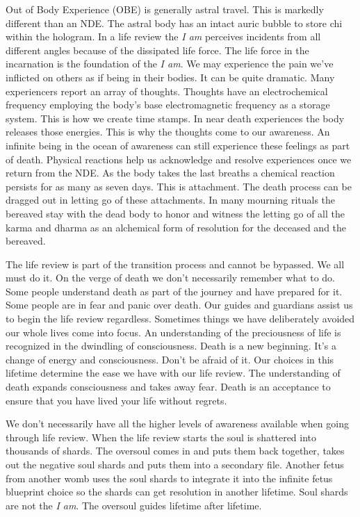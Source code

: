 \documentclass[letterpaper,9pt,twoside,titlepage,onecolumn,openany]{book}
\begin{document}
Out of Body Experience (OBE) is generally astral travel. This is
markedly different than an NDE. The astral body has an intact auric
bubble to store chi within the hologram. In a life review the \emph{I
am} perceives incidents from all different angles because of the
dissipated life force. The life force in the incarnation is the
foundation of the \emph{I am}. We may experience the pain we've
inflicted on others as if being in their bodies. It can be quite
dramatic. Many experiencers report an array of thoughts. Thoughts have
an electrochemical frequency employing the body's base electromagnetic
frequency as a storage system. This is how we create time stamps. In
near death experiences the body releases those energies. This is why the
thoughts come to our awareness. An infinite being in the ocean of
awareness can still experience these feelings as part of death. Physical
reactions help us acknowledge and resolve experiences once we return
from the NDE. As the body takes the last breaths a chemical reaction
persists for as many as seven days. This is attachment. The death
process can be dragged out in letting go of these attachments. In many
mourning rituals the bereaved stay with the dead body to honor and
witness the letting go of all the karma and dharma as an alchemical form
of resolution for the deceased and the bereaved.

The life review is part of the transition process and cannot be
bypassed. We all must do it. On the verge of death we don't necessarily
remember what to do. Some people understand death as part of the journey
and have prepared for it. Some people are in fear and panic over death.
Our guides and guardians assist us to begin the life review regardless.
Sometimes things we have deliberately avoided our whole lives come into
focus. An understanding of the preciousness of life is recognized in the
dwindling of consciousness. Death is a new beginning. It's a change of
energy and consciousness. Don't be afraid of it. Our choices in this
lifetime determine the ease we have with our life review. The
understanding of death expands consciousness and takes away fear. Death
is an acceptance to ensure that you have lived your life without
regrets.

We don't necessarily have all the higher levels of awareness available
when going through life review. When the life review starts the soul is
shattered into thousands of shards. The oversoul comes in and puts them
back together, takes out the negative soul shards and puts them into a
secondary file. Another fetus from another womb uses the soul shards to
integrate it into the infinite fetus blueprint choice so the shards can
get resolution in another lifetime. Soul shards are not the \emph{I am}.
The oversoul guides lifetime after lifetime.
\end{document}
